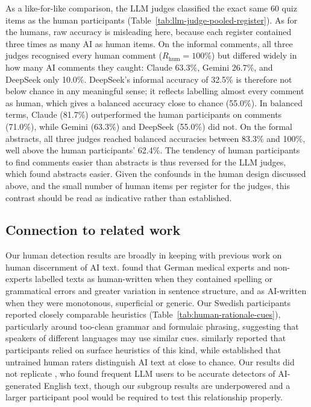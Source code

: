 \documentclass[thesis]{cluu}
\begin{document}
As a like-for-like comparison, the LLM judges classified the exact same 60 quiz items as the human participants (Table~\ref{tab:llm-judge-pooled-register}). As for the humans, raw accuracy is misleading here, because each register contained three times as many AI as human items. On the informal comments, all three judges recognised every human comment ($R_{\mathrm{hum}}=100\%$) but differed widely in how many AI comments they caught: Claude 63.3\%, Gemini 26.7\%, and DeepSeek only 10.0\%. DeepSeek's informal accuracy of 32.5\% is therefore not below chance in any meaningful sense; it reflects labelling almost every comment as human, which gives a balanced accuracy close to chance (55.0\%). In balanced terms, Claude (81.7\%) outperformed the human participants on comments (71.0\%), while Gemini (63.3\%) and DeepSeek (55.0\%) did not. On the formal abstracts, all three judges reached balanced accuracies between 83.3\% and 100\%, well above the human participants' 62.4\%. The tendency of human participants to find comments easier than abstracts is thus reversed for the LLM judges, which found abstracts easier. Given the confounds in the human design discussed above, and the small number of human items per register for the judges, this contrast should be read as indicative rather than established.

\subsection{Connection to related work}
Our human detection results are broadly in keeping with previous work on human discernment of AI text. \textcite{doruetal} found that German medical experts and non-experts labelled texts as human-written when they contained spelling or grammatical errors and greater variation in sentence structure, and as AI-written when they were monotonous, superficial or generic. Our Swedish participants reported closely comparable heuristics (Table~\ref{tab:human-rationale-cues}), particularly around too-clean grammar and formulaic phrasing, suggesting that speakers of different languages may use similar cues. \textcite{dugan2024detecting} similarly reported that participants relied on surface heuristics of this kind, while \textcite{clark2021all} established that untrained human raters distinguish AI text at close to chance. Our results did not replicate \textcite{russell2025people}, who found frequent LLM users to be accurate detectors of AI-generated English text, though our subgroup results are underpowered and a larger participant pool would be required to test this relationship properly.
\end{document}

